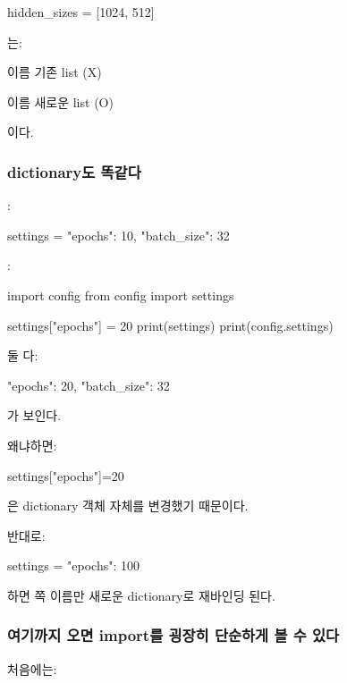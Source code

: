 \begin{dhkcode}
hidden_sizes = [1024, 512]
\end{dhkcode}

는:

\begin{dhksmry}[centered]
    이름 \ra 기존 list (X)

    이름 \ra 새로운 list (O)
\end{dhksmry}

이다.

\subsubsection{dictionary도 똑같다}

:

\begin{dhkcode}
settings = {
    "epochs": 10,
    "batch_size": 32
}
\end{dhkcode}

:

\begin{dhkcode}
import config
from config import settings

settings["epochs"] = 20
print(settings)
print(config.settings)
\end{dhkcode}

둘 다:

\begin{dhkzsh}
{
    "epochs": 20,
    "batch_size": 32
}
\end{dhkzsh}

가 보인다.

왜냐하면:

\begin{dhkcode}
settings["epochs"]=20
\end{dhkcode}

은 dictionary 객체 자체를 변경했기 때문이다.

반대로:

\begin{dhkcode}
settings = {
    "epochs": 100
}
\end{dhkcode}

하면 쪽 이름만 새로운 dictionary로 재바인딩 된다.

\subsubsection{여기까지 오면 import를 굉장히 단순하게 볼 수 있다}

처음에는:

